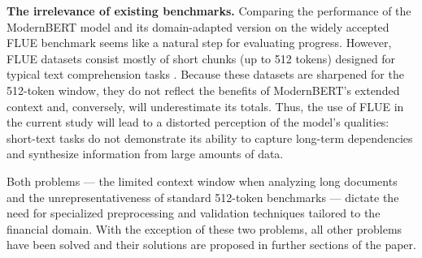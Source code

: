 \textbf{The irrelevance of existing benchmarks.} Comparing the performance of the ModernBERT model and its
domain-adapted version on the widely accepted FLUE benchmark seems like a natural step for evaluating progress.
However, FLUE datasets consist mostly of short chunks (up to 512 tokens) designed for typical text comprehension
tasks \parencite{FLANG2022FLUE}. Because these datasets are sharpened for the 512-token window, they do not
reflect the benefits of ModernBERT's extended context and, conversely, will underestimate its totals. Thus,
the use of FLUE in the current study will lead to a distorted perception of the model's qualities: short-text
tasks do not demonstrate its ability to capture long-term dependencies and synthesize information from large
amounts of data.

Both problems --- the limited context window when analyzing long documents and the unrepresentativeness of standard
512-token benchmarks --- dictate the need for specialized preprocessing and validation techniques tailored
to the financial domain. With the exception of these two problems, all other problems have been solved and their
solutions are proposed in further sections of the paper.